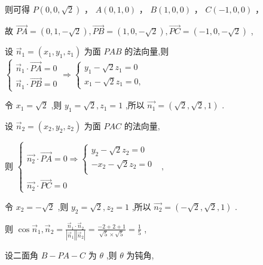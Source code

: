 \documentclass[10pt]{article}
\begin{document}
则可得 \(P\left( {0,0,\sqrt{2}}\right)\) ， \(A\left( {0,1,0}\right)\) ， \(B\left( {1,0,0}\right)\) ， \(C\left( {-1,0,0}\right)\) ，

故 \(\overrightarrow{PA} = \left( {0,1, - \sqrt{2}}\right) ,\overrightarrow{PB} = \left( {1,0, - \sqrt{2}}\right) ,\overrightarrow{PC} = \left( {-1,0, - \sqrt{2}}\right)\) ,

设 \({\overrightarrow{n}}_{1} = \left( {{x}_{1},{y}_{1},{z}_{1}}\right)\) 为面 \({PAB}\) 的法向量,则 \(\left\{  {\begin{array}{l} {\overrightarrow{n}}_{1} \cdot  \overrightarrow{PA} = 0 \\  {\overrightarrow{n}}_{1} \cdot  \overrightarrow{PB} = 0 \end{array} \Rightarrow  \left\{  \begin{array}{l} {y}_{1} - \sqrt{2}{z}_{1} = 0 \\  {x}_{1} - \sqrt{2}{z}_{1} = 0, \end{array}\right. }\right.\)

令 \({x}_{1} = \sqrt{2}\) ,则 \({y}_{1} = \sqrt{2},{z}_{1} = 1\) ,所以 \(\overrightarrow{{n}_{1}} = \left( {\sqrt{2},\sqrt{2},1}\right)\) .

设 \({\overrightarrow{n}}_{2} = \left( {{x}_{2},{y}_{2},{z}_{2}}\right)\) 为面 \({PAC}\) 的法向量,

则 \(\left\{  {\begin{array}{l} \overrightarrow{{n}_{2}} \cdot  \overrightarrow{PA} = 0 \Rightarrow  \left\{  \begin{array}{l} {y}_{2} - \sqrt{2}{z}_{2} = 0 \\   - {x}_{2} - \sqrt{2}{z}_{2} = 0 \\   \end{array}\right. \\  \overrightarrow{{n}_{2}} \cdot  \overrightarrow{PC} = 0 \end{array}\text{ , }}\right.\)

令 \({x}_{2} =  - \sqrt{2}\) ,则 \({y}_{2} = \sqrt{2},{z}_{2} = 1\) ,所以 \(\overrightarrow{{n}_{2}} = \left( {-\sqrt{2},\sqrt{2},1}\right)\) .

则 \(\cos {\overrightarrow{n}}_{1},{\overrightarrow{n}}_{2} = \frac{{\overrightarrow{n}}_{1} \cdot  {\overrightarrow{n}}_{2}}{\left| {\overrightarrow{n}}_{1}\right| \left| {\overrightarrow{n}}_{2}\right| } = \frac{-2 + 2 + 1}{\sqrt{5} \times  \sqrt{5}} = \frac{1}{5}\) ,

设二面角 \(B - {PA} - C\) 为 \(\theta\) ,则 \(\theta\) 为钝角,
\end{document}
